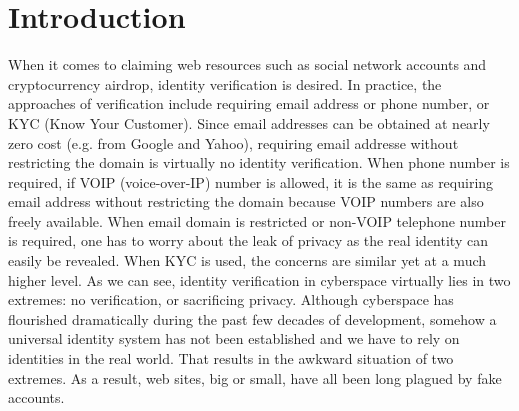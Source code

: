 \documentclass[12pt, a4paper]{article}
\begin{document}
\tableofcontents

\newpage

\section{Introduction}

When it comes to claiming web resources such as social network accounts and cryptocurrency airdrop, identity verification is desired. In practice, the approaches of verification include requiring email address or phone number, or KYC (Know Your Customer). Since email addresses can be obtained at nearly zero cost (e.g. from Google and Yahoo), requiring email addresse without restricting the domain is virtually no identity verification. When phone number is required, if VOIP (voice-over-IP) number is allowed, it is the same as requiring email address without restricting the domain because VOIP numbers are also freely available. When email domain is restricted or non-VOIP telephone number is required, one has to worry about the leak of privacy as the real identity can easily be revealed. When KYC is used, the concerns are similar yet at a much higher level. As we can see, identity verification in cyberspace virtually lies in two extremes: no verification, or sacrificing privacy. Although cyberspace has flourished dramatically during the past few decades of development, somehow a universal identity system has not been established and we have to rely on identities in the real world. That results in the awkward situation of two extremes. As a result, web sites, big or small, have all been long plagued by fake accounts.
\end{document}
